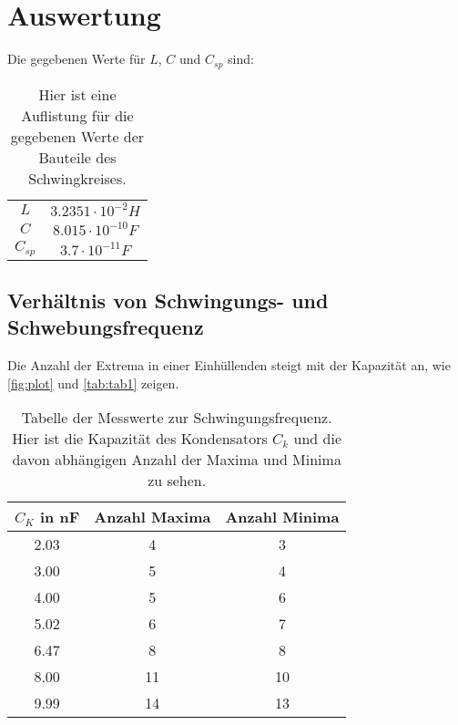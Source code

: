 \newpage
\section{Auswertung}
\label{sec:Auswertung}

Die gegebenen Werte für \(L\), \(C\) und \(C_{sp}\) sind:
\begin{table}
  \centering
  \caption{Hier ist eine Auflistung für die gegebenen Werte der Bauteile des Schwingkreises.}
  \label{tab:tab}
  \begin{tabular}{c c}
    \midrule
    \(L\) & \(3.2351\cdot10^{-2} H\)\\
    \(C\) & \(8.015\cdot10^{-10} F\)\\
    \(C_{sp}\) & \(3.7\cdot10^{-11} F\)\\
    \bottomrule
  \end{tabular}
\end{table}

\subsection{Verhältnis von Schwingungs- und Schwebungsfrequenz}
Die Anzahl der Extrema in einer Einhüllenden steigt mit der Kapazität an, wie \autoref{fig:plot} und \autoref{tab:tab1} zeigen.
\begin{table}
  \centering
  \caption{Tabelle der Messwerte zur Schwingungsfrequenz. Hier ist die Kapazität des Kondensators \(C_k\) und die davon abhängigen Anzahl der Maxima und Minima zu sehen.}
  \label{tab:tab1}
  \begin{tabular}{c c c}
    \toprule
    \(C_K\) in nF & Anzahl Maxima & Anzahl Minima\\
    \midrule
    2.03 & 4 & 3\\
    3.00 & 5 & 4\\
    4.00 & 5 & 6\\
    5.02 & 6 & 7\\
    6.47 & 8 & 8\\
    8.00 & 11 & 10\\
    9.99 & 14 & 13\\
    \bottomrule
  \end{tabular}
\end{table}

